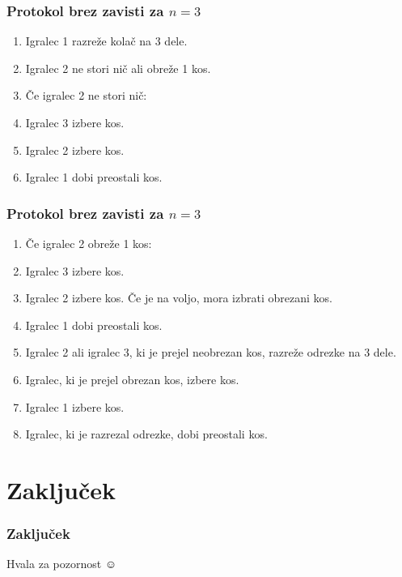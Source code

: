 \documentclass{beamer}
\begin{document}
	\begin{frame}
		\frametitle{Protokol brez zavisti za $n = 3$}
		\begin{enumerate}
			\item Igralec 1 razreže kolač na 3 dele.
			
			\item Igralec 2 ne stori nič ali obreže 1 kos.
			
			\item[] Če igralec 2 ne stori nič:
			
			\item \qquad Igralec 3 izbere kos.
			
			\item \qquad Igralec 2 izbere kos.
			
			\item \qquad Igralec 1 dobi preostali kos.
		\end{enumerate}
	\end{frame}

	\begin{frame}
		\frametitle{Protokol brez zavisti za $n = 3$}
		\begin{enumerate}
			
			\item[] Če igralec 2 obreže 1 kos:
			
			\setcounter{enumi}{2}
			
			\item \qquad Igralec 3 izbere kos.
			
			\item \qquad Igralec 2 izbere kos. Če je na voljo, mora izbrati obrezani kos.
			
			\item \qquad Igralec 1 dobi preostali kos.
					
			\setcounter{enumi}{5}
			
			\item \qquad Igralec 2 ali igralec 3, ki je prejel neobrezan kos, razreže odrezke na 3 dele.
			
			\item \qquad Igralec, ki je prejel obrezan kos, izbere kos.
			
			\item \qquad Igralec 1 izbere kos.
			
			\item \qquad Igralec, ki je razrezal odrezke, dobi preostali kos.
		\end{enumerate}
	\end{frame}



	\section{Zaključek}
	
	\begin{frame}
		\frametitle{Zaključek}
		\centering \huge
		Hvala za pozornost $\smiley$
	\end{frame}
\end{document}
